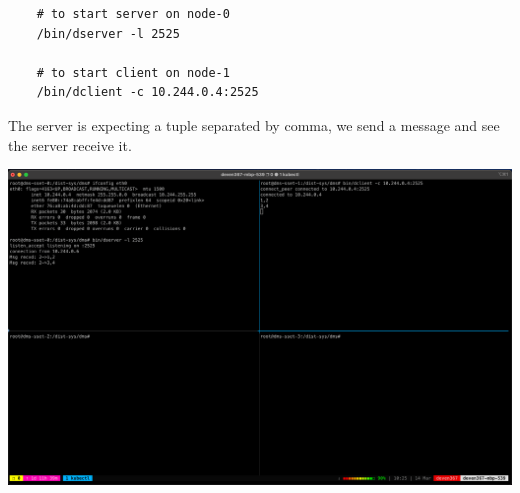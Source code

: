 \documentclass{article}
\begin{document}
\begin{lstlisting}
    # to start server on node-0
    /bin/dserver -l 2525

    # to start client on node-1
    /bin/dclient -c 10.244.0.4:2525

\end{lstlisting}

The server is expecting a tuple separated by comma, we send a message and see the server receive it.

\includegraphics[scale=0.345]{final-output.png}
\end{document}
